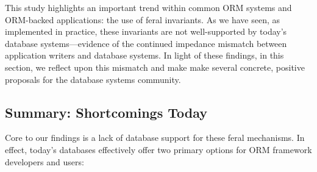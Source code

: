 This study highlights an important trend within common ORM systems and
ORM-backed applications: the use of feral invariants. As we have seen,
as implemented in practice, these invariants are not well-supported by
today's database systems---evidence of the continued impedance
mismatch between application writers and database systems. In light of
these findings, in this section, we reflect upon this mismatch and
make make several concrete, positive proposals for the database
systems community.

\subsection{Summary: Shortcomings Today}

Core to our findings is a lack of database support for these
feral mechanisms. In effect, today's databases effectively offer two
primary options for ORM framework developers and users:

